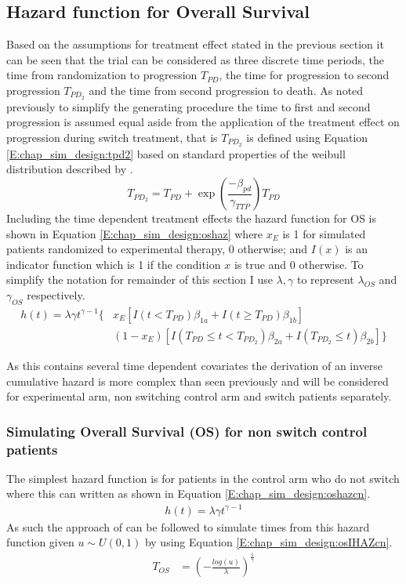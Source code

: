 \subsection{Hazard function for Overall Survival}

Based on the assumptions for treatment effect stated in the previous section it can be seen that the trial can be considered as three discrete time periods, the time from randomization to progression $T_{PD}$, the time for progression to second progression $T_{PD_2}$ and the time from second progression to death. As noted previously to simplify the generating procedure the time to first and second progression is assumed equal aside from the application of the treatment effect on progression during switch treatment, that is $T_{PD_2}$ is defined using Equation \ref{E:chap_sim_design:tpd2} based on standard properties of the weibull distribution described by \cite{collett}.
\begin{equation}
\label{E:chap_sim_design:tpd2}
T_{PD_2} = T_{PD} + \exp(\frac{-\beta_{pd}}{\gamma_{TTP}}) T_{PD}
\end{equation}
Including the time dependent treatment effects the hazard function for OS is shown in Equation \ref{E:chap_sim_design:oshaz} where $x_{E}$ is 1 for simulated patients randomized to experimental therapy, 0 otherwise; and $I(x)$ is an indicator function which is 1 if the condition $x$ is true and 0 otherwise. To simplify the notation for remainder of this section I use $\lambda, \gamma$ to represent $\lambda_{OS}$ and $\gamma_{OS}$ respectively.
\begin{align}
\label{E:chap_sim_design:oshaz}
h(t)  =  \lambda \gamma t^{\gamma-1} \{ & x_{E} \left[ I(t < T_{PD}) \beta_{1a} + I(t \geq T_{PD}) \beta_{1b} \right] \nonumber \\ 
       & (1-x_{E}) \left[ I(T_{PD} \leq t < T_{PD_2}) \beta_{2a} + I(T_{PD_2} \leq t) \beta_{2b} \right] \} 
\end{align}
\par
As this contains several time dependent covariates the derivation of an inverse cumulative hazard is more complex than seen previously and will be considered for experimental arm, non switching control arm and switch patients separately.
\subsubsection{Simulating Overall Survival (OS) for non switch control patients}
The simplest hazard function is for patients in the control arm who do not switch where this can written as  shown in Equation \ref{E:chap_sim_design:oshazcn}. 
\begin{align}
\label{E:chap_sim_design:oshazcn}
h(t) = \lambda \gamma t^{\gamma-1}  
\end{align}
As such the approach of \cite{Bender2005} can be followed to simulate times from this hazard function given $u \sim U(0,1)$  by using Equation \ref{E:chap_sim_design:osIHAZcn}.
\begin{align}
\label{E:chap_sim_design:osIHAZcn}
T_{OS} &= \left( - \frac{log(u)}{\lambda} \right) ^\frac{1}{\gamma}
\end{align}

